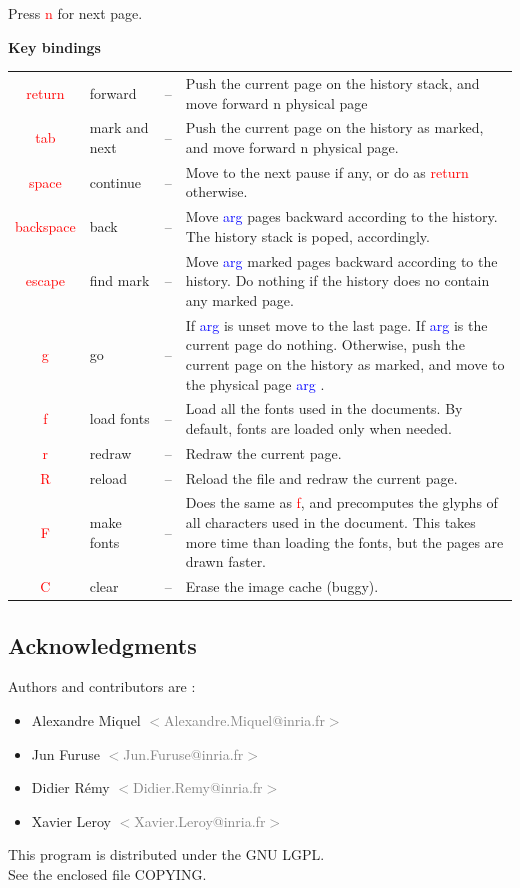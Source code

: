 \documentclass[12pt]{article}
\def\email#1{\textcolor{gray}{$<${#1}$>$ }}
\def\key#1{\textcolor{red}{#1}}
\def\ikey#1#2#3{\key{#1} & #2 & -- & #3\\}
\def\arg{\textcolor{blue}{arg }}
\begin{document}

\begin{center}
Press \key{n} for next page.
\end{center}

\newpage

\Large
\begin{center}
\textbf{Key bindings}
\end{center}
\normalsize


\noindent
\begin{tabularx}{\linewidth}{clcX}
\ikey{return}{forward}
{Push the current page on the history stack, and move forward n physical page}
\ikey{tab}{mark and next}
{Push the current page on the history as marked, and move forward n physical page.}
\ikey{space}{continue}
{Move to the next pause if any, or do as \key{return} otherwise.}
\ikey{backspace}{back}
{Move \arg pages backward according to the history. The history stack is poped, accordingly.}
\ikey{escape}{find mark}
{Move \arg marked pages backward according to the history.
 Do nothing if the history does no contain any marked page.}
\ikey{g}{go}
{If \arg is unset move to the last page.
 If \arg is the current page do nothing.
 Otherwise, push the current page on the history as marked, and move
 to the physical page \arg.}
\ikey{f}{load fonts}{Load all the fonts used in the documents.  By default, fonts are loaded only when needed.}
\ikey{r}{redraw}{Redraw the current page.}
\ikey{R}{reload}{Reload the file and redraw the current page.}
\ikey{F}{make fonts}
{Does the same as \key{f}, and precomputes the glyphs of all characters used in the document.
This takes more time than loading the fonts, but the pages are drawn faster.}
\ikey{C}{clear}{Erase the image cache (buggy).}
\end{tabularx}


\newpage

\subsection*{Acknowledgments}

Authors and contributors are :

\begin{itemize}
\item Alexandre Miquel \email{Alexandre.Miquel@inria.fr}
\item Jun Furuse \email{Jun.Furuse@inria.fr}
\item Didier R\'emy \email{Didier.Remy@inria.fr}
\item Xavier Leroy \email{Xavier.Leroy@inria.fr}
\end{itemize}


\begin{center}
This program is distributed under the GNU LGPL. \\
See the enclosed file COPYING.
\end{center}

\end{document}
